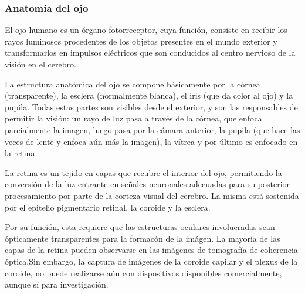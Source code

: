 		\subsubsection{Anatom\'ia del ojo}

El ojo humano es un \'organo fotorreceptor, cuya funci\'on, consiste en recibir los rayos luminosos procedentes de los objetos presentes en el mundo exterior y transformarlos en impulsos el\'ectricos que son conducidos al centro nervioso de la visi\'on en el cerebro. 

La estructura anat\'omica del ojo se compone b\'asicamente por la c\'ornea (transparente), la esclera (normalmente blanca), el iris (que da color al ojo) y la pupila. Todas estas partes son visibles desde el exterior, y son las responsables de permitir la visi\'on: un rayo de luz pasa a trav\'es de la c\'ornea, que enfoca parcialmente la imagen, luego pasa por la c\'amara anterior, la pupila (que hace las veces de lente y enfoca a\'un m\'as la imagen), la v\'itrea y por \'ultimo es enfocado en la retina.

La retina es un tejido en capas que recubre el interior del ojo, permitiendo la conversi\'on de la luz entrante en señales neuronales adecuadas para su posterior procesamiento por parte de la corteza visual del cerebro. La misma est\'a sostenida por el epitelio pigmentario retinal, la coroide y la esclera.

Por su funci\'on, esta requiere que las estructuras oculares involucradas sean \'opticamente transparentes para la formac\'on de la im\'agen.
La mayor\'ia de las capas de la retina pueden observarse en las im\'agenes de tomografía de coherencia óptica.Sin embargo, la captura de imágenes de la coroide capilar y el plexus de la coroide, no puede realizarse aún con dispositivos disponibles comercialmente, aunque sí para investigación.\cite{abramoff2010retinal}

